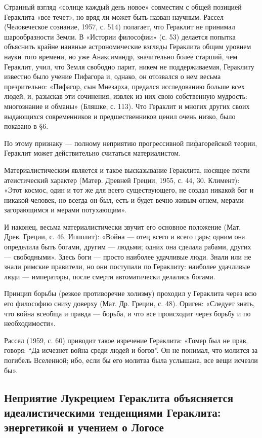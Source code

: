 Странный взгляд «солнце каждый день новое» совместим с общей позицией
Гераклита «все течет», но вряд ли может быть назван научным. Рассел
(Человеческое сознание, 1957, с. 514) полагает, что Гераклит не
принимал шарообразности Земли. В «Истории философии» (с. 53) делается
попытка объяснить крайне наивные астрономические взгляды Гераклита
общим уровнем науки того времени, но уже Анаксимандр, значительно
более старший, чем Гераклит, учил, что Земля свободно парит, никем не
поддерживаемая, Гераклиту известно было учение Пифагора и, однако, он
отозвался о нем весьма презрительно: «Пифагор, сын Мнезарха, предался
исследованию больше всех людей, и, разыскав эти сочинения, извлек из
них свою собственную мудрость: многознание и обманы» (Бляшке, с. 113).
Что Гераклит и многих других своих выдающихся современников и
предшественников ценил очень низко, было показано в §6.

По этому признаку --- полному неприятию прогрессивной пифагорейской
теории, Гераклит может действительно считаться материалистом.

Материалистическим является и такое высказывание Гераклита, носящее
почти атеистический характер (Матер. Древней Греции, 1955, с. 44, 30.
Климент): «Этот космос, один и тот же для всего существующего, не
создал никакой бог и никакой человек, но всегда он был, есть и будет
вечно живым огнем, мерами загорающимся и мерами потухающим».

И наконец, весьма материалистически звучит его основное положение
(Мат. Древ. Греции, с. 46, Ипполит): «Война --- отец всего и всего
царь; одним она определила быть богами, другим --- людьми; одних она
сделала рабами, других --- свободными». Здесь боги --- просто наиболее
удачливые люди. Знали или не знали римские правители, но они поступали
по Гераклиту: наиболее удачливые люди --- императоры, после смерти
автоматически делались богами.

Принцип борьбы (резкое противоречие холизму) проходил у Гераклита
через всю его философию снизу доверху (Мат. Др. Греции, с. 48).
Ориген: «Следует знать, что война всеобща и правда --- борьба, и что
все происходит через борьбу и по необходимости».

Рассел (1959, с. 60) приводит такое изречение Гераклита: «Гомер был не
прав, говоря: ``Да исчезнет война среди людей и богов''. Он не
понимал, что молится за погибель Вселенной; ибо, если бы его молитва
была услышана, все вещи исчезли бы».

\subsection{Неприятие Лукрецием Гераклита объясняется идеалистическими
тенденциями Гераклита: энергетикой и учением о Логосе}


